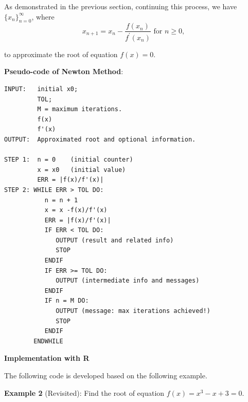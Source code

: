 \documentclass[
]{book}
\begin{document}
As demonstrated in the previous section, continuing this process, we have \(\{x_n\}_{n = 0}^\infty\), where
\[
x_{n+1} = x_n - \frac{f(x_n)}{f^\prime(x_n)} \text{ for } n \ge 0,
\]

to approximate the root of equation \(f(x) = 0\).

\textbf{Pseudo-code of Newton Method}:

\begin{verbatim}
INPUT:   initial x0;
         TOL;
         M = maximum iterations.
         f(x)
         f'(x)
OUTPUT:  Approximated root and optional information.

STEP 1:  n = 0    (initial counter)
         x = x0   (initial value)
         ERR = |f(x)/f'(x)|
STEP 2: WHILE ERR > TOL DO:
           n = n + 1
           x = x -f(x)/f'(x)
           ERR = |f(x)/f'(x)|
           IF ERR < TOL DO:
              OUTPUT (result and related info)
              STOP
           ENDIF
           IF ERR >= TOL DO:
              OUTPUT (intermediate info and messages)
           ENDIF
           IF n = M DO:
              OUTPUT (message: max iterations achieved!)
              STOP
           ENDIF
        ENDWHILE
\end{verbatim}

\textbf{Implementation with R}

The following code is developed based on the following example.

\textbf{Example 2} (Revisited): Find the root of equation \(f(x) = x^3 - x + 3 =0\).
\end{document}
